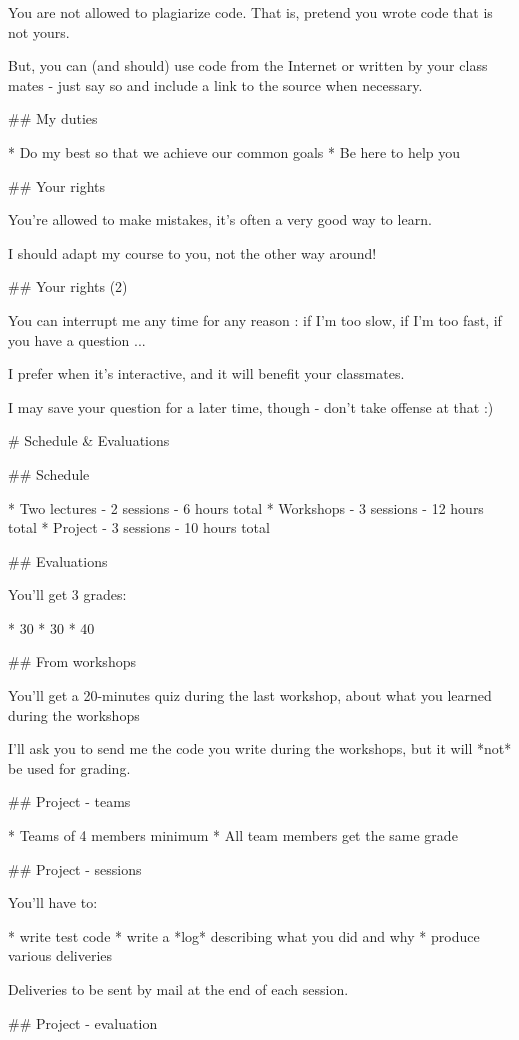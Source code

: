 You are not allowed to plagiarize code. That is, pretend
you wrote code that is not yours.

But, you can (and should) use code from the Internet or
written by your class mates - just say so and include
a link to the source when necessary.

## My duties

* Do my best so that we achieve our common goals
* Be here to help you


## Your rights

You're allowed to make mistakes, it's often a very
good way to learn.

I should adapt my course to you, not
the other way around!

## Your rights (2)

You can interrupt me any time for any reason : if I'm too slow, if I'm too fast,
if you have a question ...

I prefer when it's interactive, and it will benefit your classmates.

I may save your question for a later time, though - don't take offense at that :)

# Schedule & Evaluations

## Schedule

* Two lectures - 2 sessions - 6 hours total
* Workshops - 3 sessions - 12 hours total
* Project - 3 sessions - 10 hours total

## Evaluations

You'll get 3 grades:

* 30%
* 30%
* 40%

## From workshops

You'll get a 20-minutes quiz during the last workshop,
about what you learned during the workshops

I'll ask you to send me the code you write during
the workshops, but it will *not* be used for grading.

## Project - teams

* Teams of 4 members minimum
* All team members get the same grade

## Project - sessions

You'll have to:

* write test code
* write a *log* describing what you did and why
* produce various deliveries

Deliveries to be sent by mail at the end of each session.

## Project - evaluation

